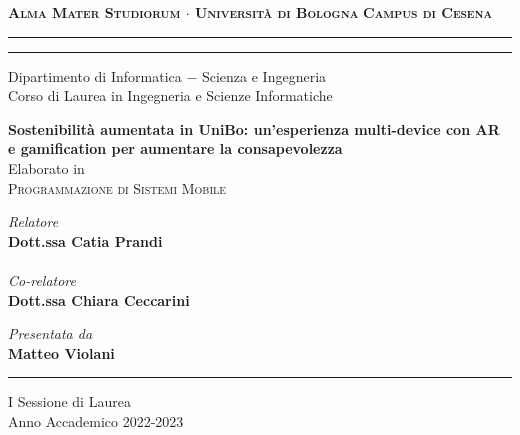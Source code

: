 \begin{titlepage}
    \begin{center}
        {\Large
            \textbf{
                \textsc{Alma Mater Studiorum $\cdot$ Università di Bologna}
            }
        }
        {\large
            \textbf{
                \textsc{Campus di Cesena}
            }
        }
        \rule[0.1cm]{16cm}{0.3mm}
        \rule[0.5cm]{16cm}{0.7mm}
        {\Large
            Dipartimento di Informatica $-$ Scienza e Ingegneria \\
        }
        \vspace*{4mm}
        {\Large 
            Corso di Laurea in Ingegneria e Scienze Informatiche
        }
        \vspace*{35mm} %
        \begin{center}
            {\LARGE
                \textbf{
                    Sostenibilità aumentata in UniBo: un'esperienza multi-device con AR e gamification per aumentare la consapevolezza
                }
            } \\
            \vspace*{20mm} %
            {\Large Elaborato in} \\
            \vspace*{3mm}
            {\Large
                \textsc{Programmazione di Sistemi Mobile}
            }
        \end{center}
        \vspace*{40mm}
        \begin{minipage}[t]{0.47\textwidth}
            {\large
                \textit{Relatore} \\
                \textbf{Dott.ssa Catia Prandi} \\
                \vspace*{1mm} \\
                \textit{Co-relatore} \\
                \textbf{Dott.ssa Chiara Ceccarini} \\
            }
        \end{minipage}
        \begin{minipage}[t]{0.47\textwidth}\raggedleft
            {\large
                \textit{Presentata da} \\
                \textbf{Matteo Violani}
            }
        \end{minipage}
    \end{center}
    \begin{center}
        \vspace*{28mm}
        \rule[0.1cm]{16cm}{0.3mm}
    \end{center}
    \begin{center}
        {\large
            I Sessione di Laurea
        } \\
        \vspace*{2mm}
        {\large
            Anno Accademico 2022-2023
        }
    \end{center}
\end{titlepage}
\restoregeometry